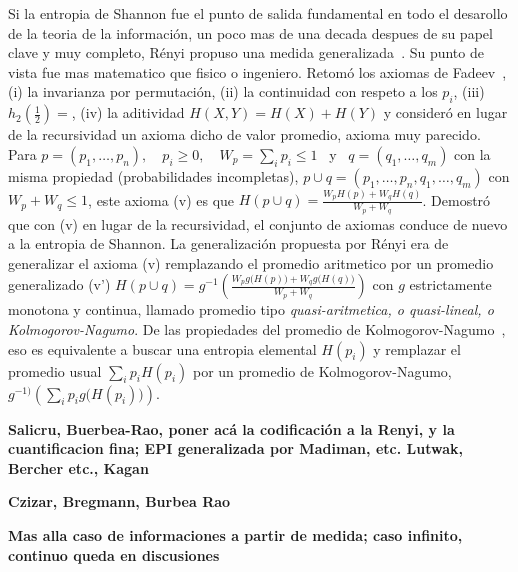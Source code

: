 \label{sec:SZ:Salicru}

Si  la entropia  de  Shannon  fue el  punto  de salida  fundamental  en todo  el
desarollo de la teoria de la informaci\'on, un poco mas de una decada despues de
su    papel   clave    y   muy    completo,   R\'enyi    propuso    una   medida
generalizada~\cite{Ren61}. Su  punto de  vista fue mas  matematico que  fisico o
ingeniero.  Retom\'o  los axiomas de  Fadeev~\cite{Fad56, Fad58, Khi57},  (i) la
invarianza por permutaci\'on, (ii) la continuidad con respeto a los $p_i$, (iii)
$h_2\left(  \frac12 \right)  =  $, (iv)  la  aditividad $H(X,Y)  = H(X)+H(Y)$  y
consider\'o  en lugar  de la  recursividad un  axioma dicho  de  valor promedio,
axioma muy  parecido. Para $p = (p_1,\ldots,p_n),  \quad p_i \ge 0,  \quad W_p =
\sum_i  p_i  \le  1$ \  y  \  $q  =  (q_1,\ldots,q_m)$  con la  misma  propiedad
(probabilidades incompletas),  $p \cup q  = (p_1,\ldots,p_n,q_1,\ldots,q_m)$ con
$W_p +  W_q \le 1$, este  axioma (v) es que  $H(p\cup q) = \frac{W_p  H(p) + W_q
  H(q)}{W_p +  W_q}$. Demostr\'o  que con  (v) en lugar  de la  recursividad, el
conjunto  de   axiomas  conduce  de  nuevo   a  la  entropia   de  Shannon.   La
generalizaci\'on  propuesta  por  R\'enyi  era  de  generalizar  el  axioma  (v)
remplazando el promedio  aritmetico por un promedio generalizado  (v') $H(p \cup
q) =  g^{-1} \left( \frac{W_p g\big( H(p)  \big) + W_q g\big(  H(q) \big)}{W_p +
    W_q}\right)$  con $g$  estrictamente monotona  y continua,  llamado promedio
tipo  {\it  quasi-aritmetica,  o  quasi-lineal, o  Kolmogorov-Nagumo}.   De  las
propiedades  del   promedio  de  Kolmogorov-Nagumo~\cite{Nag30,   Kol30,  Kol91,
  HarLit52},  eso es  equivalente a  buscar  una entropia  elemental $H(p_i)$  y
remplazar  el   promedio  usual   $\sum_i  p_i  H(p_i)$   por  un   promedio  de
Kolmogorov-Nagumo, $g^{-1)} \left( \sum_i p_i g\big( H(p_i) \big) \right)$.

{\bf  Salicru, Buerbea-Rao,  poner  ac\'a la  codificaci\'on  a la  Renyi, y  la
  cuantificacion fina; EPI generalizada  por Madiman, etc. Lutwak, Bercher etc.,
  Kagan}


\label{sec:SZ:Czizar}

{\bf Czizar, Bregmann, Burbea Rao}



\label{sec:SZ:Cuanticas}

{\bf Mas alla caso de informaciones a partir de medida; caso infinito, continuo queda en discusiones}






